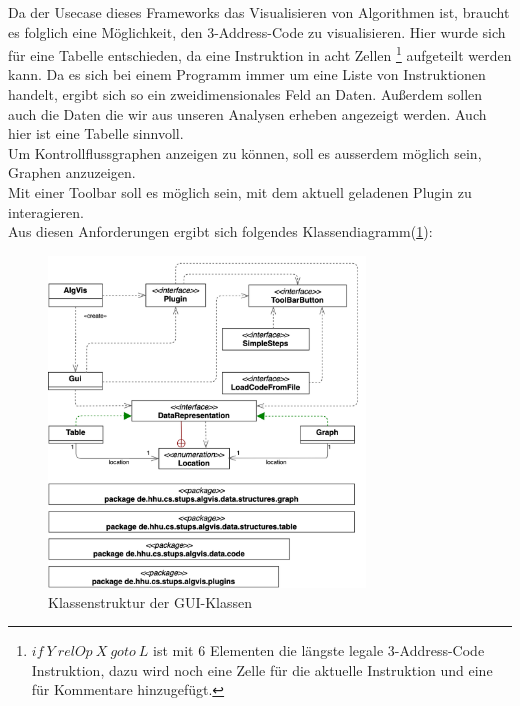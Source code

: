 \newpage
Da der Usecase dieses Frameworks das Visualisieren von Algorithmen ist, 
braucht es folglich eine Möglichkeit, den 3-Address-Code zu visualisieren.
Hier wurde sich für eine Tabelle entschieden, da eine Instruktion in acht Zellen
\footnote{$if\ Y\ relOp\ X\ goto\ L$ ist mit 6 Elementen die längste legale 3-Address-Code Instruktion,
dazu wird noch eine Zelle für die aktuelle Instruktion und eine für Kommentare hinzugefügt.} 
aufgeteilt werden kann. Da es sich bei einem Programm immer um
eine Liste von Instruktionen handelt, ergibt sich so ein zweidimensionales Feld an Daten.
Außerdem sollen auch die Daten die wir aus unseren Analysen erheben
angezeigt werden. Auch hier ist eine Tabelle sinnvoll.\\

Um Kontrollflussgraphen anzeigen zu können, soll es ausserdem möglich sein,
Graphen anzuzeigen.\\

Mit einer Toolbar soll es möglich sein, mit dem aktuell geladenen Plugin zu interagieren.\\


Aus diesen Anforderungen ergibt sich folgendes Klassendiagramm(\cref{fig:gui-classes}):\\
\begin{figure}[h]
  \centering
  \vspace{-15pt}
  \includegraphics[width=0.75\textwidth]{fig/GUI_classes.png}
  \vspace{-10pt}
  \caption{Klassenstruktur der GUI-Klassen}%
  \label{fig:gui-classes}
\end{figure}
\vspace{-20pt}

